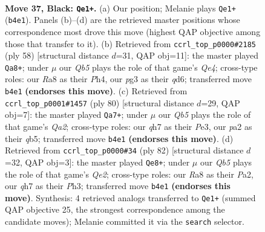 \documentclass[11pt]{article}
\begin{document}
\clearpage

\begin{figure}[p]\centering
\begin{subfigure}{0.46\textwidth}\centering
\resizebox{\linewidth}{!}{%
\newchessgame
\chessboard[
  setfen={r7/7Q/3pkp2/8/pq6/6P1/P4P1P/6K1 b - - 0 37},
  showmover=false,
  pgfstyle=straightmove, color=movearrow, markmove={b4-e1}
]}
\caption{}
\end{subfigure}\hfill
\begin{subfigure}{0.46\textwidth}\centering
\resizebox{\linewidth}{!}{%
\newchessgame
\chessboard[
  setfen={6k1/5ppp/3qp3/8/3PQ2P/8/5PP1/6K1 w - - 1 30},
  showmover=false,
  pgfstyle=straightmove, color=movearrow, markmove={e4-a8}
]}
\caption{}
\end{subfigure}
\\[4pt]
\begin{subfigure}{0.46\textwidth}\centering
\resizebox{\linewidth}{!}{%
\newchessgame
\chessboard[
  setfen={8/5k1p/1P1p2p1/1qpP4/6p1/4P3/Q5PP/6K1 w - - 1 41},
  showmover=false,
  pgfstyle=straightmove, color=movearrow, markmove={a2-a7}
]}
\caption{}
\end{subfigure}\hfill
\begin{subfigure}{0.46\textwidth}\centering
\resizebox{\linewidth}{!}{%
\newchessgame
\chessboard[
  setfen={6k1/2q2pb1/6pp/1Bp5/8/7P/P3QPP1/6K1 w - - 2 42},
  showmover=false,
  pgfstyle=straightmove, color=movearrow, markmove={e2-e8}
]}
\caption{}
\end{subfigure}
\caption{\textbf{Move 37, Black: \texttt{Qe1+}.} (a) Our position; Melanie plays \texttt{Qe1+} (\texttt{b4e1}). Panels (b)--(d) are the retrieved master positions whose correspondence most drove this move (highest QAP objective among those that transfer to it). (b) Retrieved from \texttt{ccrl\_top\_p0000\#2185} (ply 58) [structural distance $d$=31, QAP obj=11]: the master played \texttt{Qa8+}; under $\mu$ our \emph{Qb5} plays the role of that game's \emph{Qe4}; cross-type roles: our \emph{R}a8 as their \emph{P}h4, our \emph{p}g3 as their \emph{q}d6; transferred move \texttt{b4e1} \textbf{(endorses this move)}. (c) Retrieved from \texttt{ccrl\_top\_p0001\#1457} (ply 80) [structural distance $d$=29, QAP obj=7]: the master played \texttt{Qa7+}; under $\mu$ our \emph{Qb5} plays the role of that game's \emph{Qa2}; cross-type roles: our \emph{q}h7 as their \emph{P}e3, our \emph{p}a2 as their \emph{q}b5; transferred move \texttt{b4e1} \textbf{(endorses this move)}. (d) Retrieved from \texttt{ccrl\_top\_p0000\#34} (ply 82) [structural distance $d$=32, QAP obj=3]: the master played \texttt{Qe8+}; under $\mu$ our \emph{Qb5} plays the role of that game's \emph{Qe2}; cross-type roles: our \emph{R}a8 as their \emph{P}a2, our \emph{q}h7 as their \emph{P}h3; transferred move \texttt{b4e1} \textbf{(endorses this move)}. Synthesis: 4 retrieved analogs transferred to \texttt{Qe1+} (summed QAP objective 25, the strongest correspondence among the candidate moves); Melanie committed it via the \texttt{search} selector.}
\label{fig:thought-m73}
\end{figure}
\end{document}
